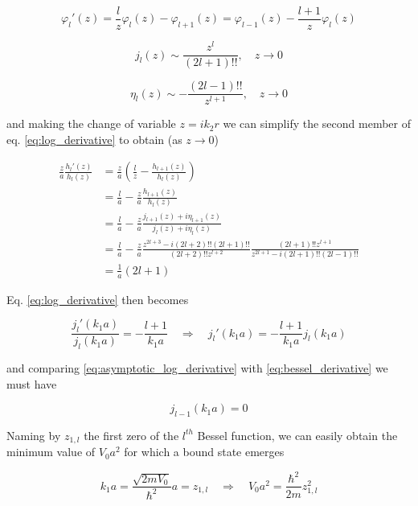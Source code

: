 \documentclass{article}
\begin{document}
\begin{equation}
\label{eq:bessel_derivative}
\varphi_l'(z) = \frac{l}{z} \varphi_l(z) - \varphi_{l+1}(z) = \varphi_{l-1}(z) - \frac{l+1}{z} \varphi_l(z)
\end{equation}

\begin{equation}
j_l(z) \sim \frac{z^l}{(2l+1)!!}, \quad z \rightarrow 0
\end{equation}

\begin{equation}
\eta_l(z) \sim -\frac{(2l-1)!!}{z^{l+1}}, \quad z \rightarrow 0
\end{equation}

and making the change of variable \( z = ik_2r \) we can simplify the second member of eq. \eqref{eq:log_derivative} to obtain (as \(z \rightarrow 0 \))

\begin{align}
\frac{z}{a} \frac{h_l'(z)}{h_l(z)} & = \frac{z}{a} \left(\frac{l}{z} - \frac{h_{l+1}(z)}{h_l(z)} \right) \nonumber \\
& = \frac{l}{a} - \frac{z}{a} \frac{h_{l+1}(z)}{h_l(z)} \nonumber \\
& = \frac{l}{a} - \frac{z}{a} \frac{j_{l+1}(z) + i\eta_{l+1}(z)}{j_l(z)+i\eta_l(z)} \nonumber \\
& = \frac{l}{a} - \frac{z}{a} \frac{z^{2l+3}-i(2l+2)!!(2l+1)!!}{(2l+2)!!z^{l+2}} \frac{(2l+1)!!z^{l+1}}{z^{2l+1}-i(2l+1)!!(2l-1)!!} \nonumber \\
& = \frac{1}{a} (2l+1)
\end{align}

Eq. \eqref{eq:log_derivative} then becomes

\begin{equation}
\label{eq:asymptotic_log_derivative}
\frac{j_l'(k_1a)}{j_l(k_1a)} = - \frac{l+1}{k_1a} \quad \Rightarrow \quad j_l'(k_1a) = - \frac{l+1}{k_1a} j_l(k_1a)
\end{equation}

and comparing \eqref{eq:asymptotic_log_derivative} with \eqref{eq:bessel_derivative} we must have

\begin{equation}
j_{l-1}(k_1a) = 0
\end{equation}

Naming by \( z_{1,l} \) the first zero of the \( l^{th} \) Bessel function, we can easily obtain the minimum value of \(V_0a^2 \) for which a bound state emerges

\begin{equation}
k_1a = \frac{\sqrt{2mV_0}}{\hbar^2}a = z_{1,l} \quad \Rightarrow \quad V_0a^2 = \frac{\hbar^2}{2m}z_{1,l}^2
\end{equation}
\end{document}
